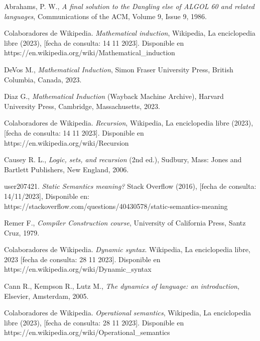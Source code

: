 \begin{thebibliography}{11}
     \bibitem{}
     \label{sec:90}
     \hypertarget{90}{}
     Abrahams, P. W., \textit{A final solution to the Dangling else of ALGOL 60 and related languages}, Communications of the ACM, Volume 9, Issue 9, 1986.%

    \bibitem{}
    \label{sec:91}
    \hypertarget{91}{}
    Colaboradores de Wikipedia. \textit{Mathematical induction}, Wikipedia, La enciclopedia libre (2023), [fecha de consulta: 14 11 2023]. Disponible en https://en.wikipedia.org/wiki/Mathematical\_induction

    \bibitem{}
    \label{sec:92}
    \hypertarget{92}{}
    DeVos M., \textit{Mathematical Induction}, Simon Fraser University Press, British Columbia, Canada, 2023.

    \bibitem{}
    \label{sec:93}
    \hypertarget{93}{}
    Diaz G., \textit{Mathematical Induction} (Wayback Machine Archive), Harvard University Press, Cambridge, Massachusetts, 2023. 

    \bibitem{}
    \label{sec:94}
    \hypertarget{94}{}
    Colaboradores de Wikipedia. \textit{Recursion}, Wikipedia, La enciclopedia libre (2023), [fecha de consulta: 14 11 2023]. Disponible en https://en.wikipedia.org/wiki/Recursion

    \bibitem{}
    \label{sec:95}
    \hypertarget{95}{}
    Causey R. L., \textit{Logic, sets, and recursion} (2nd ed.), Sudbury, Mass: Jones and Bartlett Publishers, New England, 2006.

    \bibitem{}
    \label{sec:96}
    \hypertarget{96}{}
    user207421. \textit{Static Semantics meaning?} Stack Overflow (2016), [fecha de consulta: 14/11/2023], Disponible en: https://stackoverflow.com/questions/40430578/static-semantics-meaning

    \bibitem{}
    \label{sec:97}
    \hypertarget{97}{}
    Remer F., \textit{Compiler Construction course}, University of California Press, Santz Cruz, 1979.

    \bibitem{}
    \label{sec:98}
    \hypertarget{98}{}
    Colaboradores de Wikipedia. \textit{Dynamic syntax}. Wikipedia, La enciclopedia libre, 2023 [fecha de consulta: 28 11 2023]. Disponible en https://en.wikipedia.org/wiki/Dynamic\_syntax

    \bibitem{}
    \label{sec:99}
    \hypertarget{99}{}
    Cann R., Kempson R., Lutz M., \textit{The dynamics of language: an introduction}, Elsevier, Amsterdam, 2005.

    \bibitem{}
    \label{sec:100}
    \hypertarget{100}{}
    Colaboradores de Wikipedia. \textit{Operational semantics}, Wikipedia, La enciclopedia libre (2023), [fecha de consulta: 28 11 2023]. Disponible en https://en.wikipedia.org/wiki/Operational\_semantics


\end{thebibliography}
